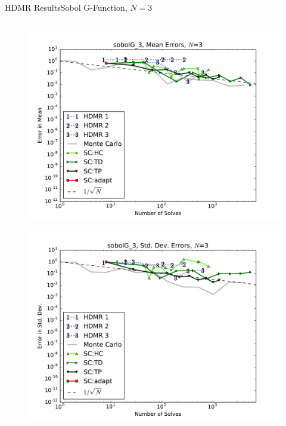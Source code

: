 \documentclass{beamer}
\begin{document}
\begin{frame}{HDMR Results}{Sobol G-Function, $N=3$}
\begin{columns}
\begin{column}{0.5\textwidth}
\begin{figure}[h!]
          \includegraphics[width=0.8\linewidth]{anlmodels/sobolG_3_mean_errs}
        \end{figure}
        \vspace{-20pt}
        \begin{figure}[h!]
          \centering
          \includegraphics[width=0.8\linewidth]{anlmodels/sobolG_3_variance_errs}
        \end{figure}
   \end{column}
 \end{columns}
\end{frame}
\end{document}
